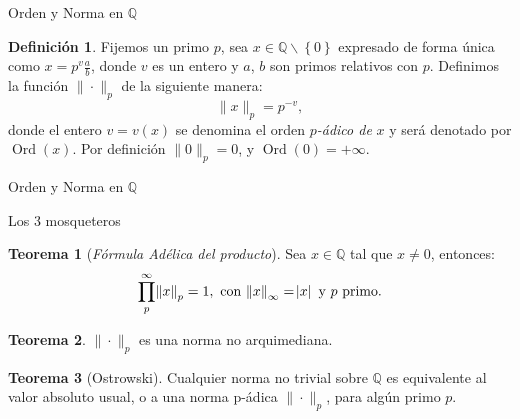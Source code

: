 \documentclass{beamer}
\newcommand{\bb}[1]{\mathbb{#1}}
\theoremstyle{definition}
\numberwithin{equation}{section}
\newcommand{\marine}[1]{\textcolor{defColor}{#1}}
\newcommand{\orangee}[1]{\textcolor{thColor}{#1}}
\newtheorem{df}{\marine{Definición}}
\newtheorem{thh}{\orangee{Teorema}}
\newcommand{\tit}[1]{\textit{#1}}
\newcommand{\Q}{\mathbb{Q}}
\newcommand{\pnorm}[1]{\|#1\|_p}
\DeclareMathOperator{\ord}{Ord}
\begin{document}


\begin{frame}{Orden y Norma en $\Q$}
\begin{df} \label{ord_def_1}
	Fijemos un primo $p$, sea $x\in\mathbb{Q\smallsetminus}\left\{  0\right\}  $ expresado de forma única como $x=p^{v}\frac{a}{b}$, donde $v$ es un entero y
	$a$, $b$ son  primos relativos con $p$.
	Definimos la función $\pnorm{\cdot}$ de la siguiente manera:
	\[
	\| x\| _{p}=p^{-v},
	\]
	donde el entero $v=v\left (  x\right)  $ se denomina el orden $p$\textit{-ádico de} $x$ y
	será denotado por $\ord\left (  x\right)  $. Por definición $\|0\|_p=0$, y  $\ord (0)=+\infty $.
\end{df}
\end{frame}
\begin{frame}{Orden y Norma en $\Q$}
	 \begin{center}
	\end{center}
\end{frame}
\begin{frame}{Los 3 mosqueteros}
	
	\begin{thh}
		[\tit{Fórmula Adélica del producto}]
		Sea $x\in \bb{Q}$ tal que $x\neq0$, entonces:
		$$\displaystyle\prod_{p}^\infty \norm{x}_p=1, \text{ con } \norm{x}_\infty=\abs{x} \text{ y $p$ primo}.$$
	\end{thh}
\begin{thh}
		$\| \cdot \|_p$ es una norma no arquimediana.	
\end{thh}
\begin{thh}
	[Ostrowski]	\label{ostrowsky} Cualquier norma no trivial sobre $\mathbb{Q}$ es equivalente al
	valor absoluto usual, o a una norma p-ádica $\| \cdot\| _{p}%
	$, para algún primo $p$.
\end{thh}
\end{frame}
\end{document}
